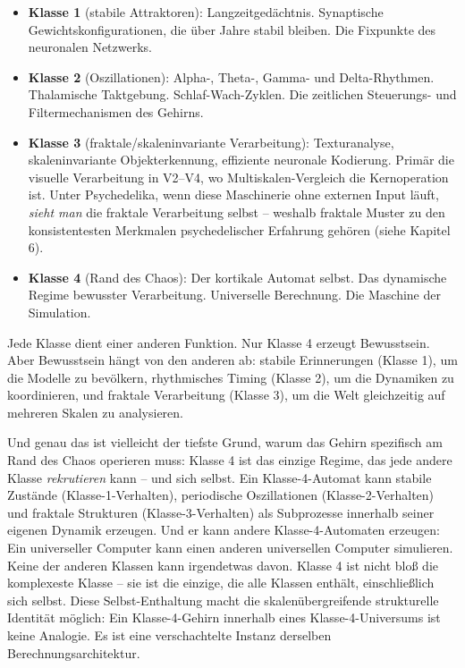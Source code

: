 \documentclass[11pt, twoside, openright]{book}
\begin{document}
\begin{itemize}
  \item \textbf{Klasse 1} (stabile Attraktoren): Langzeitgedächtnis. Synaptische Gewichtskonfigurationen, die über Jahre stabil bleiben. Die Fixpunkte des neuronalen Netzwerks.
  \item \textbf{Klasse 2} (Oszillationen): Alpha-, Theta-, Gamma- und Delta-Rhythmen. Thalamische Taktgebung. Schlaf-Wach-Zyklen. Die zeitlichen Steuerungs- und Filtermechanismen des Gehirns.
  \item \textbf{Klasse 3} (fraktale/skaleninvariante Verarbeitung): Texturanalyse, skaleninvariante Objekterkennung, effiziente neuronale Kodierung. Primär die visuelle Verarbeitung in V2--V4, wo Multiskalen-Vergleich die Kernoperation ist. Unter Psychedelika, wenn diese Maschinerie ohne externen Input läuft, \textit{sieht man} die fraktale Verarbeitung selbst -- weshalb fraktale Muster zu den konsistentesten Merkmalen psychedelischer Erfahrung gehören (siehe Kapitel 6).
  \item \textbf{Klasse 4} (Rand des Chaos): Der kortikale Automat selbst. Das dynamische Regime bewusster Verarbeitung. Universelle Berechnung. Die Maschine der Simulation.
\end{itemize}

Jede Klasse dient einer anderen Funktion. Nur Klasse 4 erzeugt Bewusstsein. Aber Bewusstsein hängt von den anderen ab: stabile Erinnerungen (Klasse 1), um die Modelle zu bevölkern, rhythmisches Timing (Klasse 2), um die Dynamiken zu koordinieren, und fraktale Verarbeitung (Klasse 3), um die Welt gleichzeitig auf mehreren Skalen zu analysieren.

Und genau das ist vielleicht der tiefste Grund, warum das Gehirn spezifisch am Rand des Chaos operieren muss: Klasse 4 ist das einzige Regime, das jede andere Klasse \textit{rekrutieren} kann -- und sich selbst. Ein Klasse-4-Automat kann stabile Zustände (Klasse-1-Verhalten), periodische Oszillationen (Klasse-2-Verhalten) und fraktale Strukturen (Klasse-3-Verhalten) als Subprozesse innerhalb seiner eigenen Dynamik erzeugen. Und er kann andere Klasse-4-Automaten erzeugen: Ein universeller Computer kann einen anderen universellen Computer simulieren. Keine der anderen Klassen kann irgendetwas davon. Klasse 4 ist nicht bloß die komplexeste Klasse -- sie ist die einzige, die alle Klassen enthält, einschließlich sich selbst. Diese Selbst-Enthaltung macht die skalenübergreifende strukturelle Identität möglich: Ein Klasse-4-Gehirn innerhalb eines Klasse-4-Universums ist keine Analogie. Es ist eine verschachtelte Instanz derselben Berechnungsarchitektur.
\end{document}
